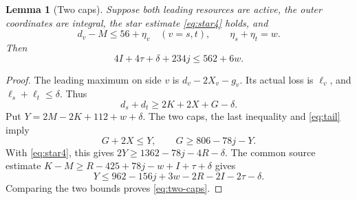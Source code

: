 \documentclass[11pt,letterpaper]{article}
\newtheorem{lemma}[theorem]{Lemma}
\theoremstyle{definition}\newtheorem{definition}[theorem]{Definition}
\begin{document}
\begin{lemma}[Two caps]\label{lem:two-caps}
Suppose both leading resources are active, the outer coordinates are integral, the star estimate \eqref{eq:star4} holds, and
\[
d_v-M\le56+\eta_v\quad(v=s,t),\qquad \eta_s+\eta_t=w.
\]
Then
\begin{equation}\label{eq:two-caps}
4I+4\tau+\delta+234j\le562+6w.
\end{equation}
\end{lemma}
\begin{proof}
The leading maximum on side $v$ is $d_v-2X_v-g_v$. Its actual loss is $\ell_v$, and $\ell_s+\ell_t\le\delta$. Thus
\[
d_s+d_t\ge2K+2X+G-\delta.
\]
Put $Y=2M-2K+112+w+\delta$. The two caps, the last inequality and \eqref{eq:tail} imply
\[
G+2X\le Y,\qquad G\ge806-78j-Y.
\]
With \eqref{eq:star4}, this gives $2Y\ge1362-78j-4R-\delta$. The common source estimate
$K-M\ge R-425+78j-w+I+\tau+\delta$ gives
\[
Y\le962-156j+3w-2R-2I-2\tau-\delta.
\]
Comparing the two bounds proves \eqref{eq:two-caps}.
\end{proof}
\end{document}
